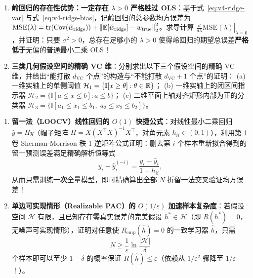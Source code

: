 \begin{enumerate}[label=\textbf{4.3.\arabic*}, leftmargin=3.3em, itemsep=5pt, start=3]
  \item\label{ex:4.3.3} \textbf{岭回归的存在性优势：一定存在 $\lambda > 0$ 严格胜过 OLS}：基于式~\eqref{eq:v4-ridge-var} 与式~\eqref{eq:v4-ridge-bias}，记岭回归的总参数均方误差为 $\mathrm{MSE}(\lambda) = \operatorname{tr}(\operatorname{Cov}(\hat{w}_{\mathrm{ridge}})) + \left\|\mathbb{E}[\hat{w}_{\mathrm{ridge}}] - w_{\text{true}}\right\|_2^2$。求导计算 $\left.\frac{d}{d\lambda}\mathrm{MSE}(\lambda)\right|_{\lambda = 0}$，并证明：只要 $\sigma^2 > 0$，总存在足够小的 $\lambda > 0$ 使得岭回归的期望总误差\textbf{严格低于}无偏的普通最小二乘 OLS！

  \item\label{ex:4.3.4} \textbf{三类几何假设空间的精确 VC 维}：分别求出以下三个假设空间的精确 VC 维，并给出“能打散 $d_{\mathrm{VC}}$ 个点”的构造与“不能打散 $d_{\mathrm{VC}}+1$ 个点”的证明：
  (a) 一维实轴上的单侧阈值 $\mathcal{H}_1 = \{\mathbb{I}[x \ge \theta] : \theta \in \mathbb{R}\}$；
  (b) 一维实轴上的闭区间指示器 $\mathcal{H}_2 = \{\mathbb{I}[a \le x \le b] : a \le b\}$；
  (c) 二维平面上轴对齐矩形内部为正的分类器 $\mathcal{H}_3 = \{\mathbb{I}[a_1 \le x_1 \le b_1,\; a_2 \le x_2 \le b_2]\}$。
\end{enumerate}

\begin{enumerate}[label=\textbf{4.3.\arabic*}, leftmargin=3.3em, itemsep=5pt, start=5]
  \item\label{ex:4.3.5} \textbf{留一法（LOOCV）线性回归的 $O(1)$ 快捷公式}：对线性最小二乘回归 $\hat{y} = H y$（帽子矩阵 $H = X(X^\top X)^{-1}X^\top$，对角元素 $h_{ii} \in (0, 1)$），利用第 1 卷 Sherman-Morrison 秩-1 逆矩阵公式证明：删去第 $i$ 个样本重新拟合得到的留一预测误差满足精确解析恒等式
  \[
    y_i - \hat{y}_i^{(-i)} = \frac{y_i - \hat{y}_i}{1 - h_{ii}},
  \]
  从而只需训练\textbf{一次}全量模型，即可精确算出全部 $N$ 折留一法交叉验证均方误差！

  \item\label{ex:4.3.6} \textbf{单边可实现情形（Realizable PAC）的 $O(1/\varepsilon)$ 加速样本复杂度}：若假设空间 $\mathcal{H}$ 有限，且已知存在零真实误差的完美假设 $h^* \in \mathcal{H}$（即 $R(h^*) = 0$，无噪声可实现情形），证明对任意使 $R_{\mathrm{emp}}(\hat{h}) = 0$ 的一致学习器 $\hat{h}$，只需
  \[
    N \ge \frac{1}{\varepsilon}\ln\frac{|\mathcal{H}|}{\delta}
  \]
  个样本即可以至少 $1-\delta$ 的概率保证 $R(\hat{h}) \le \varepsilon$（依赖从 $1/\varepsilon^2$ 骤降至 $1/\varepsilon$！）。
\end{enumerate}

